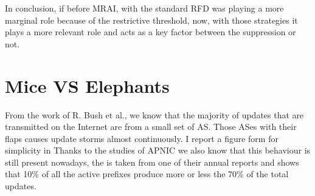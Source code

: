 In conclusion, if before \ac{MRAI}, with the standard \ac{RFD} was playing a more
marginal role because of the restrictive threshold, now, with those strategies
it plays a more relevant role and acts as a key factor between the suppression 
or not.


\section{Mice VS Elephants}
\label{sec:bgp_rfd_mice_vs_elephants}

From the work of R. Bush et al., \cite{pelsser2011route} we know that the majority
of updates that are transmitted on the Internet are from a small set of \ac{AS}.
Those \ac{AS}es with their flaps causes update storms almost continuously.
I report a figure form \cite{pelsser2011route} for simplicity in 
Thanks to the studies of APNIC 
we also know that this behaviour is still present nowadays, the 
is taken from one of their annual reports and shows that \num{10}\% of
all the active prefixes produce more or less the \num{70}\% of the total
updates.

